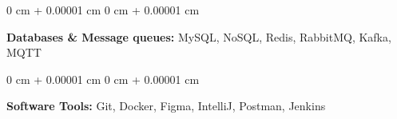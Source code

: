 \documentclass[10pt, letterpaper]{article}
\newenvironment{onecolentry}{
    \begin{adjustwidth}{
        0 cm + 0.00001 cm
    }{
        0 cm + 0.00001 cm
    }
}{
    \end{adjustwidth}
}
\begin{document}
        \vspace{0.1 cm}
        
        \begin{onecolentry}
        \textbf{Databases \& Message queues:} MySQL, NoSQL, Redis, RabbitMQ, Kafka, MQTT \  %
        \end{onecolentry}
        
        \vspace{0.1 cm}
        
        \begin{onecolentry}
        \textbf{Software Tools:} Git, Docker, Figma, IntelliJ, Postman, Jenkins \\  %
        \vspace{0.1 cm}
        \end{onecolentry}


    
\end{document}
